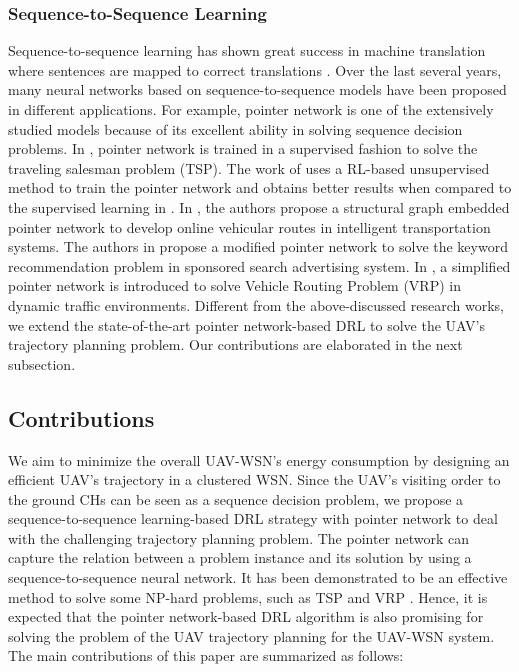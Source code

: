 \documentclass[journal]{IEEEtran}
\begin{document}
	 \subsubsection{Sequence-to-Sequence Learning}
	 Sequence-to-sequence learning has shown great success in machine translation where sentences are mapped to correct translations \cite{H. Zhang}. Over the last several years, many neural networks based on sequence-to-sequence models have been proposed in different applications. For example, pointer network is one of the extensively studied models because of its excellent ability in solving sequence decision problems. In \cite{O. Vinyals}, pointer network is trained in a supervised fashion to solve the traveling salesman problem (TSP). The work of \cite{I. Bello} uses a RL-based unsupervised method to train the pointer network and obtains better results when compared to the supervised learning in \cite{O. Vinyals}. In \cite{J. J. Q. Yu}, the authors propose a structural graph embedded pointer network to develop online vehicular routes in intelligent transportation systems. The authors in \cite{Z. Li} propose a modified pointer network to solve the keyword recommendation problem in sponsored search advertising system. In \cite{M. Nazari}, a simplified pointer network is introduced to solve Vehicle Routing Problem (VRP) in dynamic traffic environments. Different from the above-discussed research works, we extend the state-of-the-art pointer network-based DRL to solve the UAV's trajectory planning problem. Our contributions are elaborated in the next subsection.
		
	\subsection{Contributions}

	We aim to minimize the overall UAV-WSN's energy consumption by designing an efficient UAV's trajectory in a clustered WSN. Since the UAV's visiting order to the ground CHs can be seen as a sequence decision problem, we propose a sequence-to-sequence learning-based DRL strategy with pointer network to deal with the challenging trajectory planning problem. The pointer network can capture the relation between a problem instance and its solution by using a sequence-to-sequence neural network. It has been demonstrated to be an effective method to solve some NP-hard problems, such as TSP \cite{I. Bello} and VRP \cite{M. Nazari}. Hence, it is expected that the pointer network-based DRL algorithm is also promising for solving the problem of the UAV trajectory planning for the UAV-WSN system. The main contributions of this paper are summarized as follows:
	
\end{document}
